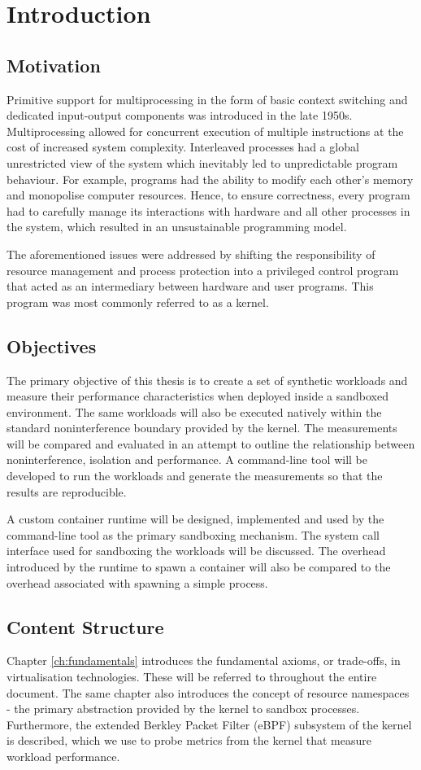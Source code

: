 \chapter{Introduction}
\section{Motivation}
Primitive support for multiprocessing in the form of basic context switching and dedicated input-output 
components was introduced in the late 1950s. Multiprocessing allowed for concurrent execution of 
multiple instructions at the cost of increased system complexity. Interleaved processes had a 
global unrestricted view of the system which inevitably led to unpredictable program behaviour. 
For example, programs had the ability to modify each other's memory and monopolise 
computer resources. Hence, to ensure correctness, every program had to carefully manage its interactions 
with hardware and all other processes in the system, which resulted in an unsustainable 
programming model.

The aforementioned issues were addressed by shifting the responsibility of resource management 
and process protection into a privileged control program that acted as an intermediary between 
hardware and user programs. This program was most commonly referred to as a kernel. 

\section{Objectives}
The primary objective of this thesis is to create a set of synthetic workloads and 
measure their performance characteristics when deployed inside a sandboxed environment.
The same workloads will also be executed natively within the standard noninterference boundary
provided by the kernel. The measurements will be compared and evaluated in an attempt to 
outline the relationship between noninterference, isolation and performance. 
A command-line tool will be developed to run the workloads and generate the measurements
so that the results are reproducible.

A custom container runtime will be designed, implemented and used by the command-line tool
as the primary sandboxing mechanism. The system call interface used for sandboxing 
the workloads will be discussed. The overhead introduced by the runtime to spawn 
a container will also be compared to the overhead associated with spawning a simple process.

\section{Content Structure}
Chapter \ref{ch:fundamentals} introduces the fundamental axioms, or trade-offs, in virtualisation technologies.
These will be referred to throughout the entire document. 
The same chapter also introduces the concept of resource namespaces - the primary abstraction 
provided by the kernel to sandbox processes. Furthermore, the extended Berkley Packet Filter (eBPF)
subsystem of the kernel is described, which we use to probe metrics from the kernel
that measure workload performance.

